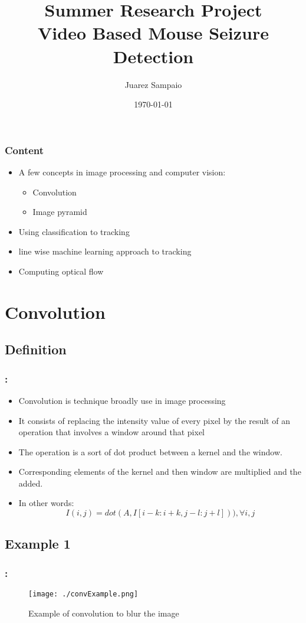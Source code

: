 \documentclass{beamer}
\title{Summer Research Project \\  Video Based Mouse Seizure Detection}
\author{Juarez Sampaio}
\institute{Rice University}
\date{\today}
\begin{document}
\begin{frame}
        \titlepage
\end{frame}

\begin{frame}[fragile]
  \frametitle{Content}
  \begin{itemize}
     \item A few concepts in image processing and computer vision:
       \begin{itemize}
           \item Convolution
           \item Image pyramid
       \end{itemize}
     \item Using classification to tracking
     \item line wise machine learning approach to tracking
     \item Computing optical flow
  \end{itemize}
\end{frame}


\section{Convolution}
\subsection{Definition}
\begin{frame}
  \frametitle{\secname : \subsecname}
  \begin{itemize}
     \item Convolution is technique broadly use in image processing
     \item It consists of replacing the intensity value of every pixel by the result of an operation that involves a
       window around that pixel
      \item The operation is a sort of dot product between a kernel and the window. 
      \item Corresponding elements of the kernel and then window are multiplied and the added.
      \item In other words:
        \begin{equation}
          I(i,j) = dot(A, I[i-k:i+k, j-l:j+l])), \forall i,j 
        \end{equation}
  \end{itemize}
\end{frame}

\subsection{Example 1}
\begin{frame}
  \frametitle{\secname : \subsecname}
  \begin{figure}
    \centering
    \texttt{[image: ./convExample.png]}
    \caption{Example of convolution to blur the image}
    \label{fig:pyr}
  \end{figure}
\end{frame}
\end{document}
